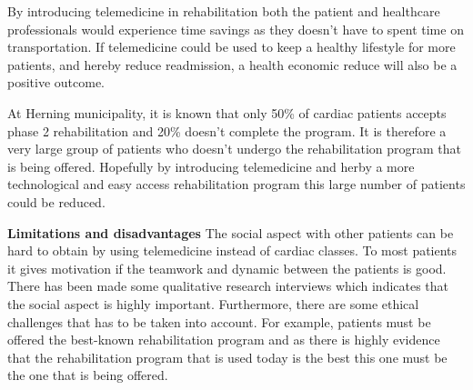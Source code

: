 By introducing telemedicine in rehabilitation both the patient and healthcare professionals would experience time savings as they doesn’t have to spent time on transportation. If telemedicine could be used to keep a healthy lifestyle for more patients, and hereby reduce readmission, a health economic reduce will also be a positive outcome. 

At Herning municipality, it is known that only 50\% of cardiac patients accepts phase 2 rehabilitation and 20\% doesn’t complete the program. It is therefore a very large group of patients who doesn’t undergo the rehabilitation program that is being offered. Hopefully by introducing telemedicine and herby a more technological and easy access rehabilitation program this large number of patients could be reduced. 

\textbf{Limitations and disadvantages} \newline
The social aspect with other patients can be hard to obtain by using telemedicine instead of cardiac classes. To most patients it gives motivation if the teamwork and dynamic between the patients is good. There has been made some qualitative research interviews which indicates that the social aspect is highly important. Furthermore, there are some ethical challenges that has to be taken into account. For example, patients must be offered the best-known rehabilitation program and as there is highly evidence that the rehabilitation program that is used today is the best this one must be the one that is being offered.     























